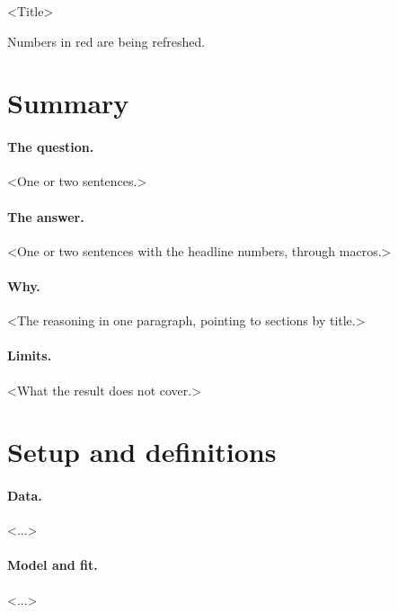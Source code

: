 \documentclass[11pt]{article}
\newif\ifnumbersfinal
\begin{document}
\begin{center}
  {\LARGE <Title>\par}
  \vspace{0.6em}
  {\par}
  \vspace{0.6em}
  {\par}
  \ifnumbersfinal\else
    \vspace{0.6em}
    {\color{red}Numbers in red are being refreshed.\par}
  \fi
\end{center}
\vspace{1em}

\section{Summary}
\label{sec:summary}

\paragraph{The question.}
<One or two sentences.>

\paragraph{The answer.}
<One or two sentences with the headline numbers, through macros.>

\paragraph{Why.}
<The reasoning in one paragraph, pointing to sections by title.>

\paragraph{Limits.}
<What the result does not cover.>

\section{Setup and definitions}
\label{sec:setup}

\paragraph{Data.} <...>
\paragraph{Model and fit.} <...>
\end{document}
